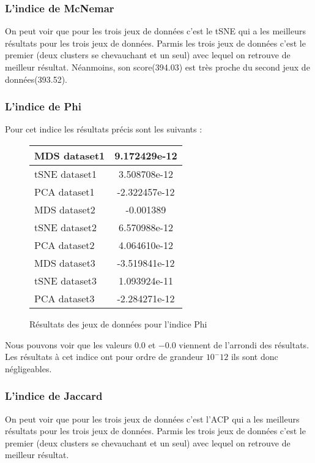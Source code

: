 \subsubsection{L'indice de McNemar}
On peut voir que pour les trois jeux de données c'est le tSNE qui a les meilleurs résultats pour les trois jeux de données.
Parmis les trois jeux de données c'est le premier (deux clusters se chevauchant et un seul) avec lequel on retrouve de meilleur résultat.
Néanmoins, son score(394.03) est très proche du second jeux de données(393.52).

\subsubsection{L'indice de Phi}

Pour cet indice les résultats précis sont les suivants : 
\smallskip

\begin{center}
    \begin{figure}[!ht]  
        \begin{tabular}{ | l | c | }
            \hline			
            MDS dataset1 & 9.172429e-12 \\ \hline
            tSNE dataset1 & 3.508708e-12 \\ \hline
            PCA dataset1 & -2.322457e-12  \\ \hline
            MDS dataset2 & -0.001389 \\  \hline
            tSNE dataset2 & 6.570988e-12 \\ \hline
            PCA dataset2 & 4.064610e-12 \\ \hline
            MDS dataset3 & -3.519841e-12 \\ \hline
            tSNE dataset3 & 1.093924e-11 \\ \hline
            PCA dataset3 & -2.284271e-12  \\ 
            \hline  
        \end{tabular}
    \caption{Résultats des jeux de données pour l'indice Phi}
    \end{figure}
\end{center}
\smallskip

Nous pouvons voir que les valeurs $0.0$ et $-0.0$ viennent de l'arrondi des résultats. Les résultats à cet indice ont pour ordre de grandeur $10^-12$ ils sont
donc négligeables.



\subsubsection{L'indice de Jaccard}
On peut voir que pour les trois jeux de données c'est l'ACP qui a les meilleurs résultats pour les trois jeux de données.
Parmis les trois jeux de données c'est le premier (deux clusters se chevauchant et un seul) avec lequel on retrouve de meilleur résultat.

